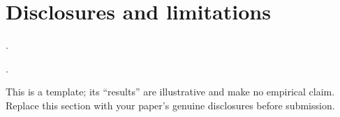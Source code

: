 
\section*{Disclosures and limitations}

\begin{description}[leftmargin=0pt, font=\normalfont\bfseries\color{primary},
                    itemsep=0.3em, style=nextline]
  \item[Data availability] \PaperDataAvail
  \item[Funding] \PaperFunding.
  \item[Competing interests] \PaperCompeting.
  \ifPaperAIUsed
    \item[AI assistance] \PaperAIStatement
  \fi
  \item[Limitations] This is a template; its ``results'' are illustrative and
    make no empirical claim. Replace this section with your paper's genuine
    disclosures before submission.
\end{description}

